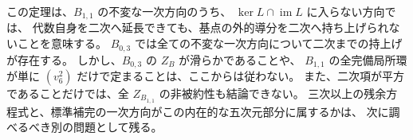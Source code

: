 この定理は、$B_{1,1}$ の不変な一次方向のうち、
$\ker L\cap\operatorname{im}L$ に入らない方向では、
代数自身を二次へ延長できても、基点の外的導分を二次へ持ち上げられないことを意味する。
$B_{0,3}$ では全ての不変な一次方向について二次までの持上げが存在する。
しかし、$B_{0,3}$ の $Z_B$ が滑らかであることや、
$B_{1,1}$ の全完備局所環が単に $(v_6^2)$ だけで定まることは、ここからは従わない。
また、二次項が平方であることだけでは、全 $Z_{B_{1,1}}$ の非被約性も結論できない。
三次以上の残余方程式と、標準補完の一次方向がこの内在的な五次元部分に属するかは、
次に調べるべき別の問題として残る。
